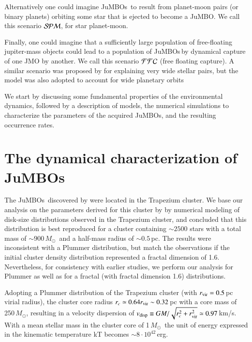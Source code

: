\documentclass[submission,phys]{lib/SciPost}
\newcommand{\MSun}{\mbox{${M}_\odot$}}
\newcommand{\jumbo}{\mbox{JuMBO}}
\newcommand{\jumbos}{\mbox{JuMBOs}}
\begin{document}
Alternatively one could imagine \jumbos\, to result from planet-moon
pairs (or binary planets) orbiting some star that is ejected to become
a \jumbo.  We call this scenario ${\cal SPM}$, for star planet-moon.

Finally, one could imagine that a sufficiently large population of
free-floating jupiter-mass objects could lead to a population of
\jumbos\,by dynamical capture of one JMO by another.  We call this
scenario ${\cal FFC}$ (free floating capture). A similar scenario was
proposed by \cite{2010MNRAS.404.1835K} for explaining very wide
stellar pairs, but the model was also adopted to account for wide
planetary orbits \cite{2012ApJ...750...83P,2018MNRAS.473.1589G}

We start by discussing some fundamental properties of the
environmental dynamics, followed by a description of models, the
numerical simulations to characterize the parameters of the acquired
\jumbos, and the resulting occurrence rates.

\section{The dynamical characterization of \jumbos}

The \jumbos\, discovered by \cite{2023arXiv231001231P} were located in
the Trapezium cluster. We base our analysis on the parameters derived
for this cluster by \cite{2016MNRAS.457..313P} by numerical modeling
of disk-size distributions observed in the Trapezium cluster, and
concluded that this distribution is best reproduced for a cluster
containing $\sim 2500$ stars with a total mass of $\sim 900$\,\MSun\,
and a half-mass radius of $\sim 0.5$\,pc. The results were
inconsistent with a Plummer \cite{1911MNRAS..71..460P} distribution,
but match the observations if the initial cluster density distribution
represented a fractal dimension of 1.6.  Nevertheless, for consistency
with earlier studies, we perform our analysis for Plummer as well as
for a fractal (with fractal dimension 1.6) distributions.

Adopting a Plummer distribution of the Trapezium cluster (with $r_{\rm
  vir} = 0.5$\,pc virial radius), the cluster core radius $r_c \simeq
0.64r_{\rm vir} \sim 0.32$\,pc with a core mass of 250\,\MSun, 
resulting in a velocity dispersion of $v_{\rm disp} \equiv
GM/\sqrt{r_c^2 + r_{\rm vir}^2} \simeq 0.97$\,km/s. With a mean
stellar mass in the cluster core of 1\,\MSun\, the unit of energy
expressed in the kinematic temperature kT becomes $\sim 8 \cdot
10^{42}$\,erg.
\end{document}
